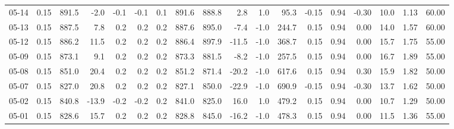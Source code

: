\begin{threeparttable}
{\begin{tabular}{lrrrrrrrrrrrrrrrrr}
  05-14 &     0.15 & 891.5 &              -2.0 &              -0.1 &               -0.1 &                0.1 & 891.6 & 888.8 &        2.8 &                      1.0 &                95.3 &      -0.15 &      0.94 &          -0.30 &             10.0 &            1.13 &                  60.00 \\
  05-13 &     0.15 & 887.5 &               7.8 &               0.2 &                0.2 &                0.2 & 887.6 & 895.0 &       -7.4 &                     -1.0 &               244.7 &       0.15 &      0.94 &           0.00 &             14.0 &            1.57 &                  60.00 \\
  05-12 &     0.15 & 886.2 &              11.5 &               0.2 &                0.2 &                0.2 & 886.4 & 897.9 &      -11.5 &                     -1.0 &               368.7 &       0.15 &      0.94 &           0.00 &             15.7 &            1.75 &                  55.00 \\
  05-09 &     0.15 & 873.1 &               9.1 &               0.2 &                0.2 &                0.2 & 873.3 & 881.5 &       -8.2 &                     -1.0 &               257.5 &       0.15 &      0.94 &           0.00 &             16.7 &            1.89 &                  55.00 \\
  05-08 &     0.15 & 851.0 &              20.4 &               0.2 &                0.2 &                0.2 & 851.2 & 871.4 &      -20.2 &                     -1.0 &               617.6 &       0.15 &      0.94 &           0.30 &             15.9 &            1.82 &                  50.00 \\
  05-07 &     0.15 & 827.0 &              20.8 &               0.2 &                0.2 &                0.2 & 827.1 & 850.0 &      -22.9 &                     -1.0 &               690.9 &      -0.15 &      0.94 &          -0.30 &             13.7 &            1.62 &                  50.00 \\
  05-02 &     0.15 & 840.8 &             -13.9 &              -0.2 &               -0.2 &                0.2 & 841.0 & 825.0 &       16.0 &                      1.0 &               479.2 &       0.15 &      0.94 &           0.00 &             10.7 &            1.29 &                  50.00 \\
  05-01 &     0.15 & 828.6 &              15.7 &               0.2 &                0.2 &                0.2 & 828.8 & 845.0 &      -16.2 &                     -1.0 &               478.3 &       0.15 &      0.94 &           0.00 &             11.5 &            1.36 &                  55.00 \\

\end{tabular}}
\end{threeparttable}
